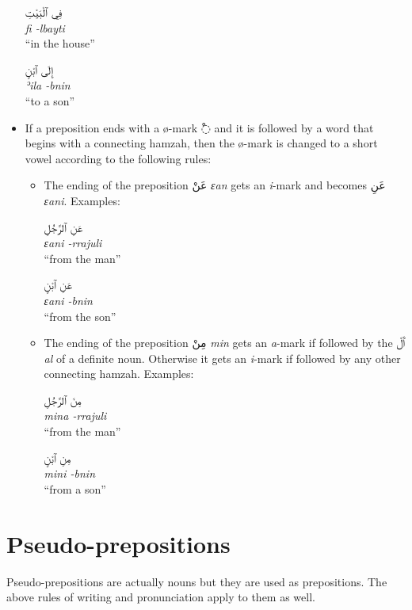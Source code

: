 \documentclass[
  10pt,
]{book}
\begin{document}
\begin{itemize}
  \foreignlanguage{arabic}{فِي ٱلْبَيْتِ}\\
  \emph{fi -lbayti}\\
  \enquote{in the house}

  \foreignlanguage{arabic}{إِلَى ٱبْنٍ}\\
  \emph{ʾila -bnin}\\
  \enquote{to a son}
\item
  If a preposition ends with a ø-mark \foreignlanguage{arabic}{◌ْ} and it is followed by a word that begins with a connecting hamzah, then the ø-mark is changed to a short vowel according to the following rules:

  \begin{itemize}
  \item
    The ending of the preposition \foreignlanguage{arabic}{عَنْ} \emph{ɛan} gets an \emph{i}-mark and becomes \foreignlanguage{arabic}{عَنِ} \emph{ɛani}. Examples:

    \foreignlanguage{arabic}{عَنِ ٱلرَّجُلِ}\\
    \emph{ɛani -rrajuli}\\
    \enquote{from the man}

    \foreignlanguage{arabic}{عَنِ ٱبْنٍ}\\
    \emph{ɛani -bnin}\\
    \enquote{from the son}
  \item
    The ending of the preposition \foreignlanguage{arabic}{مِنْ} \emph{min} gets an \emph{a}-mark if followed by the \foreignlanguage{arabic}{ٱَلْ} \emph{al} of a definite noun. Otherwise it gets an \emph{i}-mark if followed by any other connecting hamzah. Examples:

    \foreignlanguage{arabic}{مِنَ ٱلرَّجُلِ}\\
    \emph{mina -rrajuli}\\
    \enquote{from the man}

    \foreignlanguage{arabic}{مِنِ ٱبْنٍ}\\
    \emph{mini -bnin}\\
    \enquote{from a son}
  \end{itemize}
\end{itemize}

\section{Pseudo-prepositions}\label{pseudo-prepositions}

Pseudo-prepositions are actually nouns but they are used as prepositions. The above rules of writing and pronunciation apply to them as well.
\end{document}
